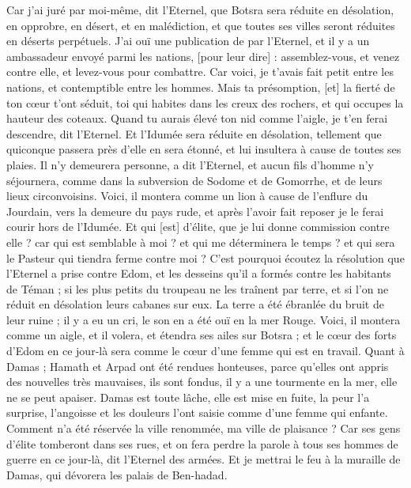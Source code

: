 \begin{multicols}{2}
Car j'ai juré par moi-même, dit l'Eternel, que Botsra sera réduite en désolation, en opprobre, en désert, et en malédiction, et que toutes ses villes seront réduites en déserts perpétuels.
J'ai ouï une publication de par l'Eternel, et il y a un ambassadeur envoyé parmi les nations, [pour leur dire] : assemblez-vous, et venez contre elle, et levez-vous pour combattre.
Car voici, je t'avais fait petit entre les nations, et contemptible entre les hommes.
Mais ta présomption, [et] la fierté de ton cœur t'ont séduit, toi qui habites dans les creux des rochers, et qui occupes la hauteur des coteaux. Quand tu aurais élevé ton nid comme l'aigle, je t'en ferai descendre, dit l'Eternel.
Et l'Idumée sera réduite en désolation, tellement que quiconque passera près d'elle en sera étonné, et lui insultera à cause de toutes ses plaies.
Il n'y demeurera personne, a dit l'Eternel, et aucun fils d'homme n'y séjournera, comme dans la subversion de Sodome et de Gomorrhe, et de leurs lieux circonvoisins.
Voici, il montera comme un lion à cause de l'enflure du Jourdain, vers la demeure du pays rude, et après l'avoir fait reposer je le ferai courir hors de l'Idumée. Et qui [est] d'élite, que je lui donne commission contre elle ? car qui est semblable à moi ? et qui me déterminera le temps ? et qui sera le Pasteur qui tiendra ferme contre moi ?
C'est pourquoi écoutez la résolution que l'Eternel a prise contre Edom, et les desseins qu'il a formés contre les habitants de Téman ; si les plus petits du troupeau ne les traînent par terre, et si l'on ne réduit en désolation leurs cabanes sur eux.
La terre a été ébranlée du bruit de leur ruine ; il y a eu un cri, le son en a été ouï en la mer Rouge.
Voici, il montera comme un aigle, et il volera, et étendra ses ailes sur Botsra ; et le cœur des forts d'Edom en ce jour-là sera comme le cœur d'une femme qui est en travail.
Quant à Damas ; Hamath et Arpad ont été rendues honteuses, parce qu'elles ont appris des nouvelles très mauvaises, ils sont fondus, il y a une tourmente en la mer, elle ne se peut apaiser.
Damas est toute lâche, elle est mise en fuite, la peur l'a surprise, l'angoisse et les douleurs l'ont saisie comme d'une femme qui enfante.
Comment n'a été réservée la ville renommée, ma ville de plaisance ?
Car ses gens d'élite tomberont dans ses rues, et on fera perdre la parole à tous ses hommes de guerre en ce jour-là, dit l'Eternel des armées.
Et je mettrai le feu à la muraille de Damas, qui dévorera les palais de Ben-hadad.

\end{multicols}
